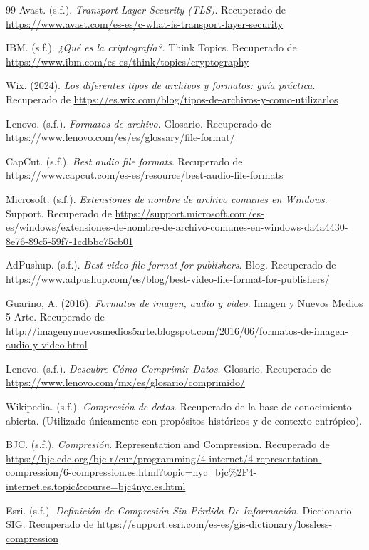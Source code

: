 \documentclass[a4paper,12pt]{article}
\begin{document}
\begin{thebibliography}{99}
Avast. (s.f.). \textit{Transport Layer Security (TLS)}. Recuperado de \url{https://www.avast.com/es-es/c-what-is-transport-layer-security}

IBM. (s.f.). \textit{¿Qué es la criptografía?}. Think Topics. Recuperado de \url{https://www.ibm.com/es-es/think/topics/cryptography}

Wix. (2024). \textit{Los diferentes tipos de archivos y formatos: guía práctica}. Recuperado de \url{https://es.wix.com/blog/tipos-de-archivos-y-como-utilizarlos}

Lenovo. (s.f.). \textit{Formatos de archivo}. Glosario. Recuperado de \url{https://www.lenovo.com/es/es/glossary/file-format/}

CapCut. (s.f.). \textit{Best audio file formats}. Recuperado de \url{https://www.capcut.com/es-es/resource/best-audio-file-formats}

Microsoft. (s.f.). \textit{Extensiones de nombre de archivo comunes en Windows}. Support. Recuperado de \url{https://support.microsoft.com/es-es/windows/extensiones-de-nombre-de-archivo-comunes-en-windows-da4a4430-8e76-89c5-59f7-1cdbbc75cb01}

AdPushup. (s.f.). \textit{Best video file format for publishers}. Blog. Recuperado de \url{https://www.adpushup.com/es/blog/best-video-file-format-for-publishers/}

Guarino, A. (2016). \textit{Formatos de imagen, audio y video}. Imagen y Nuevos Medios 5 Arte. Recuperado de \url{http://imagenynuevosmedios5arte.blogspot.com/2016/06/formatos-de-imagen-audio-y-video.html}

Lenovo. (s.f.). \textit{Descubre Cómo Comprimir Datos}. Glosario. Recuperado de \url{https://www.lenovo.com/mx/es/glosario/comprimido/}

Wikipedia. (s.f.). \textit{Compresión de datos}. Recuperado de la base de conocimiento abierta. (Utilizado únicamente con propósitos históricos y de contexto entrópico).

BJC. (s.f.). \textit{Compresión}. Representation and Compression. Recuperado de \url{https://bjc.edc.org/bjc-r/cur/programming/4-internet/4-representation-compression/6-compression.es.html?topic=nyc_bjc%2F4-internet.es.topic&course=bjc4nyc.es.html}

Esri. (s.f.). \textit{Definición de Compresión Sin Pérdida De Información}. Diccionario SIG. Recuperado de \url{https://support.esri.com/es-es/gis-dictionary/lossless-compression}


\end{thebibliography}
\end{document}
